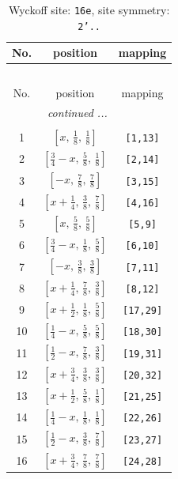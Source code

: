 \documentclass[fleqn,8pt]{jsarticle}
\begin{document}
\renewcommand{\arraystretch}{1.2}
\begin{longtable}{ccc}
\caption{Wyckoff site: {\tt 16e}, site symmetry: {\tt 2'..}}
 \\
 \hline \hline
No. & position & mapping \\ \hline \endfirsthead

\multicolumn{2}{l}{\tablename\ \thetable{}} \\
 \hline \hline
No. & position & mapping \\ \hline \endhead

 \hline \hline
\multicolumn{2}{r}{\footnotesize\it continued ...} \\ \endfoot

 \hline \hline
\multicolumn{2}{r}{} \\ \endlastfoot

1 & $\left[ x,\, \frac{1}{8},\, \frac{1}{8} \right]$ & {\tt [1,13]} \\ \hline
2 & $\left[ \frac{3}{4} - x,\, \frac{5}{8},\, \frac{1}{8} \right]$ & {\tt [2,14]} \\ \hline
3 & $\left[ - x,\, \frac{7}{8},\, \frac{7}{8} \right]$ & {\tt [3,15]} \\ \hline
4 & $\left[ x + \frac{1}{4},\, \frac{3}{8},\, \frac{7}{8} \right]$ & {\tt [4,16]} \\ \hline
5 & $\left[ x,\, \frac{5}{8},\, \frac{5}{8} \right]$ & {\tt [5,9]} \\ \hline
6 & $\left[ \frac{3}{4} - x,\, \frac{1}{8},\, \frac{5}{8} \right]$ & {\tt [6,10]} \\ \hline
7 & $\left[ - x,\, \frac{3}{8},\, \frac{3}{8} \right]$ & {\tt [7,11]} \\ \hline
8 & $\left[ x + \frac{1}{4},\, \frac{7}{8},\, \frac{3}{8} \right]$ & {\tt [8,12]} \\ \hline
9 & $\left[ x + \frac{1}{2},\, \frac{1}{8},\, \frac{5}{8} \right]$ & {\tt [17,29]} \\ \hline
10 & $\left[ \frac{1}{4} - x,\, \frac{5}{8},\, \frac{5}{8} \right]$ & {\tt [18,30]} \\ \hline
11 & $\left[ \frac{1}{2} - x,\, \frac{7}{8},\, \frac{3}{8} \right]$ & {\tt [19,31]} \\ \hline
12 & $\left[ x + \frac{3}{4},\, \frac{3}{8},\, \frac{3}{8} \right]$ & {\tt [20,32]} \\ \hline
13 & $\left[ x + \frac{1}{2},\, \frac{5}{8},\, \frac{1}{8} \right]$ & {\tt [21,25]} \\ \hline
14 & $\left[ \frac{1}{4} - x,\, \frac{1}{8},\, \frac{1}{8} \right]$ & {\tt [22,26]} \\ \hline
15 & $\left[ \frac{1}{2} - x,\, \frac{3}{8},\, \frac{7}{8} \right]$ & {\tt [23,27]} \\ \hline
16 & $\left[ x + \frac{3}{4},\, \frac{7}{8},\, \frac{7}{8} \right]$ & {\tt [24,28]} \\
\end{longtable}
\end{document}
